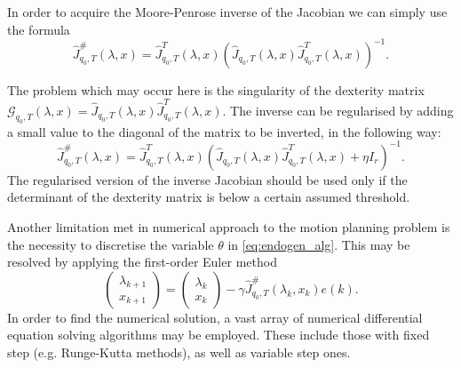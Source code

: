 In order to acquire the Moore-Penrose inverse of the Jacobian we can simply use the formula
\begin{equation}
\hat J^\#_{q_0, T}(\lambda, x)=\hat J^T_{q_0, T}(\lambda, x)\left(\hat J_{q_0, T}(\lambda, x)\hat J^T_{q_0, T}(\lambda, x)\right)^{-1}.
\end{equation}

The problem which may occur here is the singularity of the dexterity matrix\\
$\mathcal{G}_{q_0,T}(\lambda,x)=\hat J_{q_0, T}(\lambda, x)\hat J^T_{q_0, T}(\lambda, x)$. The inverse can be regularised by adding a small value to the diagonal of the matrix to be inverted, in the following way:
\begin{equation}
\hat J^\#_{q_0, T}(\lambda, x)=\hat J^T_{q_0, T}(\lambda, x)\left(\hat J_{q_0, T}(\lambda, x)\hat J^T_{q_0, T}(\lambda, x)+\eta I_r\right)^{-1}.
\end{equation}
The regularised version of the inverse Jacobian should be used only if the determinant of the dexterity matrix is below a certain assumed threshold.

Another limitation met in numerical approach to the motion planning problem is the necessity to discretise the variable $\theta$ in \eqref{eq:endogen_alg}.
This may be resolved by applying the first-order Euler method
\begin{equation}
\label{eq:endogen_num}
\begin{pmatrix}
\lambda_{k+1}\\
x_{k+1}
\end{pmatrix}  =\begin{pmatrix}\lambda_{k}\\
x_{k}
\end{pmatrix} - \gamma \hat J^\#_{q_0, T}(\lambda_k, x_k)e(k).
\end{equation}
In order to find the numerical solution, a vast array of numerical differential equation solving algorithms may be employed. These include those with fixed step (e.g. Runge-Kutta methods), as well as variable step ones.